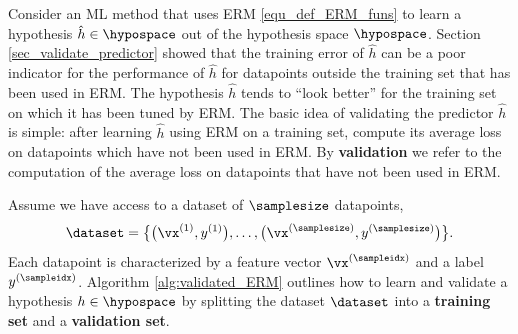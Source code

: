 \documentclass[12pt]{report}
\begin{document}

%

Consider an ML method that uses ERM \eqref{equ_def_ERM_funs} to learn a hypothesis $\hat{h} \in \hypospace$ 
out of the hypothesis space $\hypospace$. Section \ref{sec_validate_predictor} showed that the training error 
of $\hat{h}$ can be a poor indicator for the performance of $\hat{h}$ for datapoints outside the training set that 
has been used in ERM. The hypothesis $\hat{h}$ tends to ``look better'' for the training set on which it has 
been tuned by ERM.
The basic idea of validating the predictor $\hat{h}$ is simple: after learning $\hat{h}$ using ERM on a 
training set, compute its average loss on datapoints which have not been used in ERM. By {\bf validation} we 
refer to the computation of the average loss on datapoints that have not been used in ERM. 

Assume we have access to a dataset of $\samplesize$ datapoints, 
$$\dataset = \big\{ \big(\vx^{(1)},y^{(1)}\big),\ldots,\big(\vx^{(\samplesize)},y^{(\samplesize)}\big)  \big\}.$$ 
Each datapoint is characterized by a feature vector $\vx^{(\sampleidx)}$ and a label $y^{(\sampleidx)}$. 
Algorithm \ref{alg:validated_ERM} outlines how to learn and validate a hypothesis $h\in \hypospace$ 
by splitting the dataset $\dataset$ into a {\bf training set} and a {\bf validation set}. 
\end{document}
